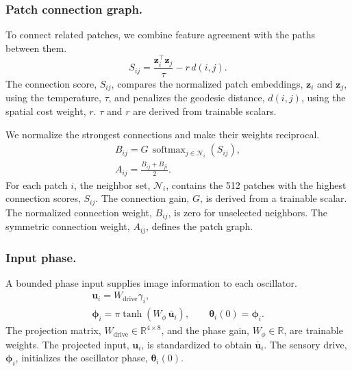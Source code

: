 \subsubsection{Patch connection graph.}
To connect related patches, we combine feature agreement with the paths between them.
\begin{equation}
S_{ij}=\frac{\boldsymbol z_i^\top\boldsymbol z_j}{\tau}-r\,d(i,j).
\end{equation}
The connection score, $S_{ij}$, compares the normalized patch embeddings, $\boldsymbol z_i$ and
$\boldsymbol z_j$, using the temperature, $\tau$, and penalizes the geodesic distance, $d(i,j)$,
using the spatial cost weight, $r$. $\tau$ and $r$ are derived from trainable scalars.

We normalize the strongest connections and make their weights reciprocal.
\begin{equation}
\begin{gathered}
 B_{ij}=G\,\operatorname{softmax}_{j\in\mathcal N_i}(S_{ij}),\\
 A_{ij}=\frac{B_{ij}+B_{ji}}{2}.
\end{gathered}
\end{equation}
For each patch $i$, the neighbor set, $\mathcal N_i$, contains the 512 patches with the highest
connection scores, $S_{ij}$. The connection gain, $G$, is derived from a trainable scalar. The
normalized connection weight, $B_{ij}$, is zero for unselected neighbors. The symmetric connection
weight, $A_{ij}$, defines the patch graph.

\subsubsection{Input phase.}
A bounded phase input supplies image information to each oscillator.
\begin{equation}
\begin{gathered}
\boldsymbol u_i=W_{\mathrm{drive}}\gamma_i,\\
\boldsymbol\phi_i=\pi\tanh(W_\phi\,\bar{\boldsymbol u}_i),\qquad
\boldsymbol\theta_i(0)=\boldsymbol\phi_i.
\end{gathered}
\end{equation}
The projection matrix, $W_{\mathrm{drive}}\in\mathbb R^{4\times8}$, and the phase gain,
$W_\phi\in\mathbb R$, are trainable weights. The projected input, $\boldsymbol u_i$, is
standardized to obtain $\bar{\boldsymbol u}_i$. The sensory drive, $\boldsymbol\phi_i$,
initializes the oscillator phase, $\boldsymbol\theta_i(0)$.

